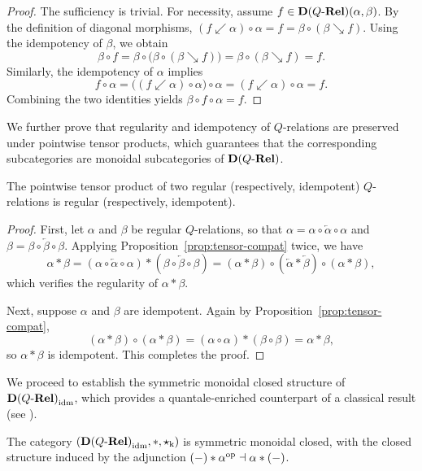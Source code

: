\documentclass{tac}
\begin{document}
\begin{proof}
The sufficiency is trivial. For necessity, assume $f\in{\mathbf{D}(Q\text{-}\mathbf{Rel})}(\alpha,\beta)$. By the definition of diagonal morphisms, $(f\swarrow\alpha)\circ\alpha=f=\beta\circ(\beta\searrow f)$. Using the idempotency of $\beta$, we obtain
\[
\beta\circ f=\beta\circ\bigl(\beta\circ(\beta\searrow f)\bigr)
=\beta\circ(\beta\searrow f)=f.
\]
Similarly, the idempotency of $\alpha$ implies
\[
f\circ\alpha=\bigl((f\swarrow\alpha)\circ\alpha\bigr)\circ\alpha
=(f\swarrow\alpha)\circ\alpha=f.
\]
Combining the two identities yields $\beta\circ f\circ\alpha=f$.
\end{proof}

We further prove that regularity and idempotency of $Q$-relations are preserved under pointwise tensor products, which guarantees that the corresponding subcategories are monoidal subcategories of ${\mathbf{D}(Q\text{-}\mathbf{Rel})}$.

\begin{proposition}\label{prop:tensor-regular}
The pointwise tensor product of two regular (respectively, idempotent) $Q$-relations is regular (respectively, idempotent).
\end{proposition}

\begin{proof}
First, let $\alpha$ and $\beta$ be regular $Q$-relations, so that $\alpha=\alpha\circ\overleftarrow{\alpha}\circ\alpha$ and $\beta=\beta\circ\overleftarrow{\beta}\circ\beta$. Applying Proposition~\ref{prop:tensor-compat} twice, we have
\[
\alpha*\beta
=(\alpha\circ\overleftarrow{\alpha}\circ\alpha)*(\beta\circ\overleftarrow{\beta}\circ\beta)
=(\alpha*\beta)\circ(\overleftarrow{\alpha}*\overleftarrow{\beta})\circ(\alpha*\beta),
\]
which verifies the regularity of $\alpha*\beta$.

Next, suppose $\alpha$ and $\beta$ are idempotent. Again by Proposition~\ref{prop:tensor-compat},
\[
(\alpha*\beta)\circ(\alpha*\beta)
=(\alpha\circ\alpha)*(\beta\circ\beta)=\alpha*\beta,
\]
so $\alpha*\beta$ is idempotent. This completes the proof.
\end{proof}

We proceed to establish the symmetric monoidal closed structure of ${\mathbf{D}(Q\text{-}\mathbf{Rel})}_{\mathrm{idm}}$, which provides a quantale-enriched counterpart of a classical result (see \cite[Proposition 2]{RosebrughWood1994}).

\begin{proposition}\label{prop:idm-closed}
The category $({\mathbf{D}(Q\text{-}\mathbf{Rel})}_{\mathrm{idm}},*,{\star_\mathrm{k}})$ is symmetric monoidal closed, with the closed structure induced by the adjunction $(-)*\alpha^{\mathrm{op}}\dashv\alpha*{(-)}$.
\end{proposition}
\end{document}
